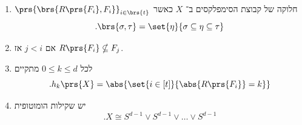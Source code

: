 \documentclass[a4paper,10pt,twoside,openany]{book}
\begin{document}
\begin{theorem}
\begin{enumerate}
\item
$\prs{\brs{R\prs{F_i}, F_i}}_{i \in \brs{t}}$
חלוקה של קבוצת הסימפלקסים ב־%
$X$
כאשר
\[\text{.} \brs{\sigma, \tau} = \set{\eta}{\sigma \subseteq \eta \subseteq \tau}\]

\item 
אם
$j < i$
אז
$R\prs{F_i} \nsubseteq F_j$.

\item לכל
$0 \leq k \leq d$
מתקיים
\[\text{.} h_k\prs{X} = \abs{\set{i \in [t]}{\abs{R\prs{F_i}} = k}}\]

\item יש שקילות הומוטופית
\[\text{.} X \cong S^{d-1} \vee S^{d-1} \vee \ldots \vee S^{d-1}\]
\end{enumerate}
\end{theorem}
\end{document}
